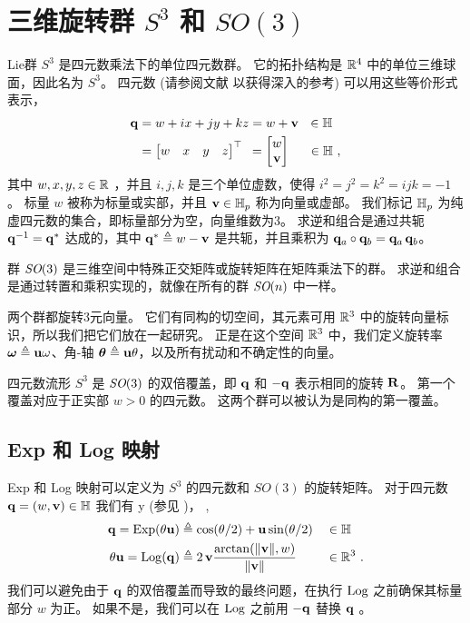 
\section{三维旋转群 $S^3$ 和 $SO(3)$}
\label{sec:S3_SO3}

Lie群 $S^3$ 是四元数乘法下的单位四元数群。
它的拓扑结构是 ${\mathbb R}^4$ 中的单位三维球面，因此名为 $S^3$。
四元数 (请参阅文献 \cite{SOLA-17-Quaternion} 以获得深入的参考) 可以用这些等价形式表示，
%
\begin{align}
\begin{split}		
{\bf q} 
&= w+ix+jy+kz
=w+{\bf v} ~~ \in{\mathbb H}
\\
&
=\begin{bmatrix}w&x&y&z\end{bmatrix}^{\top} 
~\,=\begin{bmatrix}w\\{\bf v}\end{bmatrix} \quad~\, \in{\mathbb H}
~,
\end{split}
\end{align}
%
其中 $w,x,y,z\in{\mathbb R}$ ，并且 $i,j,k$ 是三个单位虚数，使得 $i^2=j^2=k^2=ijk=-1$ 。
标量 $w$ 被称为标量或实部，并且 ${\bf v}\in{\mathbb H}_p$ 称为向量或虚部。
我们标记 ${\mathbb H}_p$ 为纯虚四元数的集合，即标量部分为空，向量维数为3。
求逆和组合是通过共轭 ${\bf q}^{-1} = {\bf q}^*$ 达成的，其中 ${\bf q}^*\triangleq w-{\bf v}$ 是共轭，并且乘积为 ${\bf q}_a\circ{\bf q}_b = {\bf q}_a\,{\bf q}_b$。

群 $\textit{SO}(3)$ 是三维空间中特殊正交矩阵或旋转矩阵在矩阵乘法下的群。
求逆和组合是通过转置和乘积实现的，就像在所有的群 $\textit{SO}(n)$ 中一样。

两个群都旋转$3$元向量。
它们有同构的切空间，其元素可用 ${\mathbb R}^3$ 中的旋转向量标识，所以我们把它们放在一起研究。
正是在这个空间 ${\mathbb R}^3$ 中，我们定义旋转率 ${{\bm \omega}}\triangleq{\bf u}\omega$、角-轴 ${{\bm \theta}}\triangleq{\bf u}\theta$，以及所有扰动和不确定性的向量。

四元数流形 $S^3$ 是 $\textit{SO}(3)$ 的双倍覆盖，即 ${\bf q}$ 和 $-{\bf q}$ 表示相同的旋转 ${\bf R}$。
第一个覆盖对应于正实部 $w>0$ 的四元数。
这两个群可以被认为是同构的第一覆盖。




\subsection{Exp 和 Log 映射}

Exp 和 Log 映射可以定义为 $S^3$ 的四元数和 $SO(3)$ 的旋转矩阵。
对于四元数 ${\bf q}=(w,{\bf v})\in{\mathbb H}$ 我们有%
%
\if \examples y (参见 )， \else, \fi
%
%
\begin{align}
{\bf q}= \operatorname*{Exp}(\theta{\bf u}) &\triangleq \cos(\theta/2) + {\bf u}\sin(\theta/2) &&\in{\mathbb H}\\ 
\theta{\bf u} = \operatorname*{Log}({\bf q}) &\triangleq 2\,{\bf v}\frac{\arctan({{\left\|{\bf v}\right\|},w})}{{\left\|{\bf v}\right\|}}&&\in{\mathbb R}^3
~.
\end{align}
%
我们可以避免由于 ${\bf q}$ 的双倍覆盖而导致的最终问题，在执行 $\operatorname*{Log}$ 之前确保其标量部分 $w$ 为正。
如果不是，我们可以在 $\operatorname*{Log}$ 之前用 $-{\bf q}$ 替换 ${\bf q}$ 。

